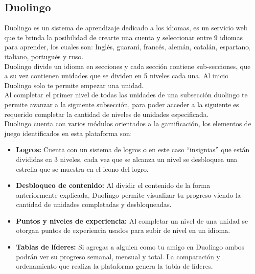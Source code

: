 \begin{multicols*}{2}
\subsection{Duolingo}

 Duolingo \cite{PagDuolingo} es un sistema de aprendizaje dedicado a los idiomas, es un servicio web que
 te brinda la posibilidad de crearte una cuenta y seleccionar entre 9 idiomas para aprender,
 los cuales son: Inglés, guaraní, francés, alemán, catalán, espartano, italiano, portugués y ruso.\\

 \noindent Duolingo divide un idioma en secciones y cada sección contiene sub-secciones,
 que a su vez contienen unidades que se dividen en 5 niveles cada una. Al inicio Duolingo
 solo te permite empezar una unidad.\\

 \noindent Al completar el primer nivel de todas las unidades de una subsección duolingo
 te permite avanzar a la siguiente subsección, para poder acceder a la siguiente es requerido
 completar la cantidad de niveles de unidades especificada.\\

 \noindent Duolingo cuenta con varios módulos orientados a la gamificación, los elementos
 de juego identificados en esta plataforma son:

    \begin{itemize}
    \item {\bf Logros:} Cuenta con un sistema de logros o en este caso ``insignias''
        que están divididas en 3 niveles, cada vez que se alcanza un nivel se
        desbloquea una estrella que se muestra en el icono del logro.

    \item {\bf Desbloqueo de contenido:} Al dividir el contenido de la forma
        anteriormente explicada, Duolingo permite visualizar tu progreso viendo
        la cantidad de unidades completadas y desbloqueadas.

    \item {\bf Puntos y niveles de experiencia:} Al completar un nivel de una unidad
        se otorgan puntos de experiencia usados para subir de nivel en un idioma.

    \item {\bf Tablas de líderes:} Si agregas a alguien como tu amigo en Duolingo ambos
        podrán ver su progreso semanal, mensual y total. La comparación y ordenamiento
        que realiza la plataforma genera la tabla de líderes.


\end{itemize}
\end{multicols*}

